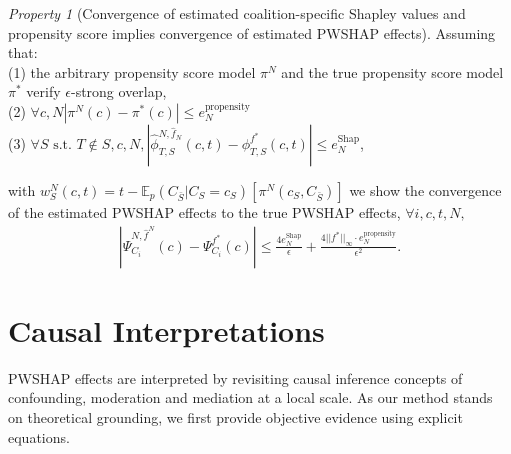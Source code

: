 \documentclass{article}
\theoremstyle{plain}
\theoremstyle{definition}
\theoremstyle{remark}
\newcommand{\effect}{\Psi}
\theoremstyle{mystyle}
\newtheorem{property}{Property}[section]
\newcommand{\coalitionshapley}[4]{\phi^{#1}_{#3,#2}(#4)}
\newcommand{\estcoalitionshapley}[5]{\hat{\phi}^{#1,#2}_{#4,#3}(#5)}
\begin{document}
\begin{property}[Convergence of estimated coalition-specific Shapley values and propensity score implies convergence of estimated PWSHAP effects] \label{prop:error_bounds_shapley} 
Assuming that: \\
(1) the arbitrary propensity score model $\pi^N$ and the true propensity score model $\pi^*$ verify $\epsilon$-strong overlap, \\
(2) $\forall c, N |\pi^N(c) - \pi^*(c) | \leq e^\text{propensity}_N$ \\
(3) $\forall S \text{ s.t. } T \notin S, c, N,  | \estcoalitionshapley{N}{\hat{f}_N}{S}{T}{c,t} - \coalitionshapley{f^*}{S}{T}{c,t} | \leq e^\text{Shap}_N$,

with $w^N_S(c,t) = t - \mathbb{E}_p(C_{\bar{S}}|C_S=c_S)[\pi^N(c_S,C_{\bar{S}})]$ we show the convergence of the estimated PWSHAP effects to the true PWSHAP effects, 
     $\forall i, c, t, N,$ 
    \begin{align*}
           | \hat{\effect}^{N,\hat{f}^N}_{C_i}(c) - \effect^{f^*}_{C_i}(c) | \leq \frac{4 e^\text{Shap}_N}{\epsilon} + \frac{4||f^*||_\infty \cdot e^\text{propensity}_N}{\epsilon^2} .
    \end{align*}

\end{property}

\section{Causal Interpretations}
\label{sec:causal_interpretation}
PWSHAP effects are interpreted by revisiting causal inference concepts of confounding, moderation and mediation at a local scale. As our method stands on theoretical grounding, we first provide objective evidence using explicit equations. %
\end{document}
